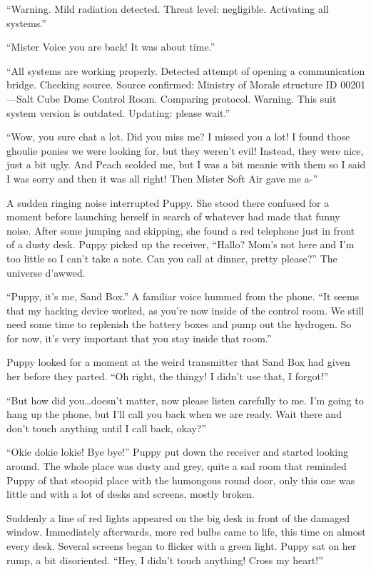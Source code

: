 {\mten ``Warning. Mild radiation detected. Threat level: negligible. Activating all systems.''}

``Mister Voice you are back! It was about time.''

{\mten ``All systems are working properly. Detected attempt of opening a communication bridge. Checking source. Source confirmed: Ministry of Morale structure ID 00201---Salt Cube Dome Control Room. Comparing protocol. Warning. This suit system version is outdated. Updating: please wait.''}

``Wow, you sure chat a lot. Did you miss me? I missed you a lot! I found those ghoulie ponies we were looking for, but they weren't evil! Instead, they were nice, just a bit ugly. And Peach scolded me, but I was a bit meanie with them so I said I was sorry and then it was all right! Then Mister Soft Air gave me a-''

A sudden ringing noise interrupted Puppy. She stood there confused for a moment before launching herself in search of whatever had made that funny noise. After some jumping and skipping, she found a red telephone just in front of a dusty desk. Puppy picked up the receiver, ``Hallo? Mom's not here and I'm too little so I can't take a note. Can you call at dinner, pretty please?'' The universe d'awwed.

``Puppy, it's me, Sand Box.'' A familiar voice hummed from the phone. ``It seems that my hacking device worked, as you're now inside of the control room. We still need some time to replenish the battery boxes and pump out the hydrogen. So for now, it's very important that you stay inside that room.''

Puppy looked for a moment at the weird transmitter that Sand Box had given her before they parted. ``Oh right, the thingy! I didn't use that, I forgot!''

``But how did you\dots doesn't matter, now please listen carefully to me. I'm going to hang up the phone, but I'll call you back when we are ready. Wait there and don't touch anything until I call back, okay?''

``Okie dokie lokie! Bye bye!'' Puppy put down the receiver and started looking around. The whole place was dusty and grey, quite a sad room that reminded Puppy of that stoopid place with the humongous round door, only this one was little and with a lot of desks and screens, mostly broken.

Suddenly a line of red lights appeared on the big desk in front of the damaged window. Immediately afterwards, more red bulbs came to life, this time on almost every desk. Several screens began to flicker with a green light. Puppy sat on her rump, a bit disoriented. ``Hey, I didn't touch anything! Cross my heart!''

